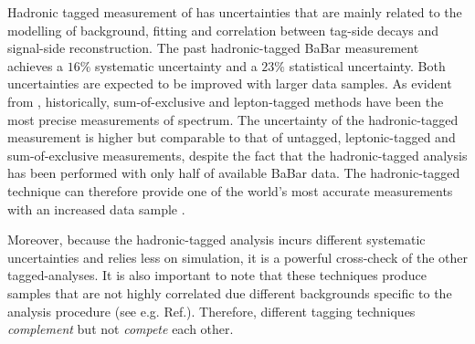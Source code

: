 Hadronic tagged measurement of \BtoXsgamma has uncertainties that are mainly related to the modelling of \BB background, \Mbc fitting and correlation between tag-side decays and signal-side reconstruction.
The past hadronic-tagged BaBar measurement \cite{BaBar:2007yhb} achieves a $16\%$ systematic uncertainty and a $23\%$ statistical uncertainty.
Both uncertainties are expected to be improved with larger data samples.
As evident from , historically, sum-of-exclusive and lepton-tagged methods have been the most precise measurements of \BtoXsgamma spectrum.
The uncertainty of the hadronic-tagged measurement is higher but comparable to that of untagged, leptonic-tagged and sum-of-exclusive measurements, despite the fact that the hadronic-tagged analysis has been performed with only half of available BaBar data.
The hadronic-tagged technique can therefore provide one of the world's most accurate measurements with an increased data sample \cite{Belle-II:2022cgf}.

Moreover, because the hadronic-tagged analysis incurs different systematic uncertainties and relies less on simulation, it is a powerful cross-check of the other tagged-analyses.
It is also important to note that these techniques produce samples that are not highly correlated due different backgrounds specific to the analysis procedure (see e.g. Ref.\cite{Belle:2009nth}).
Therefore, different tagging techniques \textit{complement} but not \textit{compete} each other.





